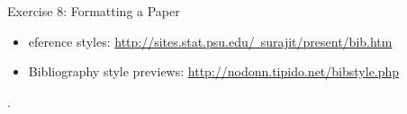 \documentclass[10pt,times]{beamer}
\begin{document}
\begin{frame}[fragile]{Exercise 8: Formatting a Paper}

\begin{center}
\end{center}

\begin{center}
\end{center}


\begin{center}
\end{center}

\begin{itemize}
\item eference styles: 
\href{http://sites.stat.psu.edu/~surajit/present/bib.htm}{http://sites.stat.psu.edu/~surajit/present/bib.htm}

\item Bibliography style previews: 
\href{http://nodonn.tipido.net/bibstyle.php}{http://nodonn.tipido.net/bibstyle.php}
\end{itemize}

\begin{center}
%
.
\end{center}

\end{frame}
\end{document}
